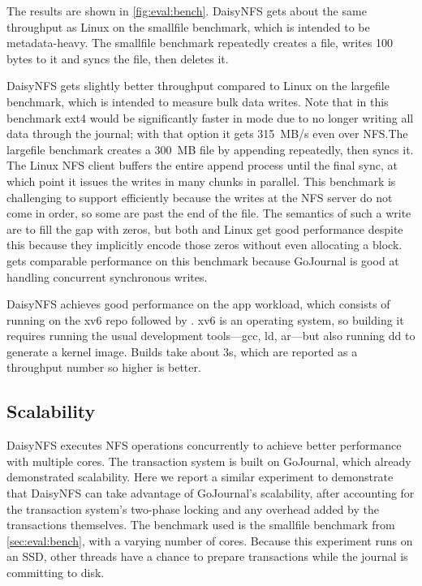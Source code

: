 The results are shown in \cref{fig:eval:bench}. DaisyNFS gets about the same
throughput as Linux on the smallfile benchmark, which is intended to
be metadata-heavy. The smallfile benchmark repeatedly creates a file,
writes 100 bytes to it and syncs the file, then deletes it.

DaisyNFS gets slightly better throughput compared to Linux on the largefile benchmark, which is
intended to measure bulk data writes. Note that in this benchmark ext4 would be
significantly faster in  mode due to no longer writing all data
through the journal; with that option it gets 315~MB/s even over
NFS.\@ The largefile benchmark creates a 300~MB file by appending repeatedly, then
syncs it. The Linux NFS client buffers the entire append process until the final
sync, at which point it issues the writes in many chunks in parallel. This
benchmark is challenging to support efficiently because the writes at the NFS
server do not come in order, so some are past the end of the file. The semantics
of such a write are to fill the gap with zeros, but both \sys and Linux get good
performance despite this because they implicitly encode those zeros without even
allocating a block. \sys gets comparable performance on this benchmark because
GoJournal is good at handling concurrent synchronous writes.

DaisyNFS achieves good performance on the app workload, which consists of running
 on the xv6 repo followed by . xv6 is an operating
system, so building it requires running the usual development tools---gcc, ld,
ar---but also running dd to generate a kernel image. Builds take about 3s,
which are reported as a throughput number so higher is better.

\subsection{Scalability}
\label{sec:eval:scale}

DaisyNFS executes NFS operations concurrently to achieve better performance with
multiple cores. The transaction system is built on GoJournal, which already
demonstrated scalability. Here we report a similar experiment to demonstrate
that DaisyNFS can take advantage of GoJournal's scalability, after accounting for
the transaction system's two-phase locking and any overhead added by the
transactions themselves. The benchmark used is the smallfile benchmark from
\cref{sec:eval:bench}, with a varying number of cores. Because this experiment runs
on an SSD, other threads have a chance to prepare transactions while the
journal is committing to disk.

